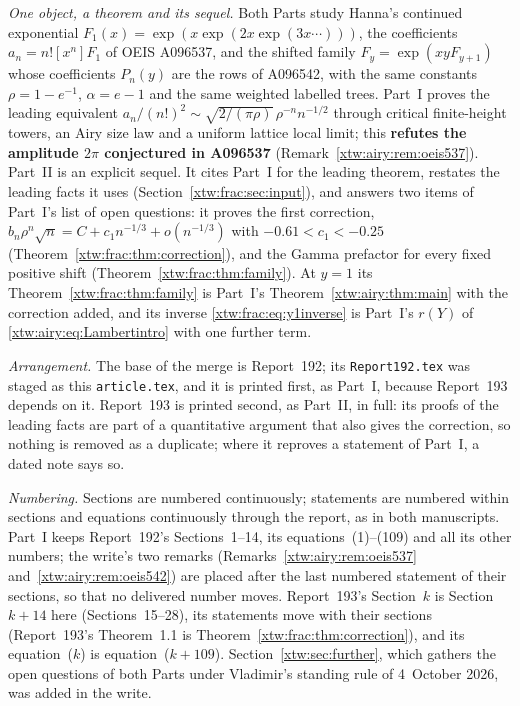 \documentclass[11pt]{article}
\theoremstyle{remark}\newtheorem{remark}[theorem]{Remark}
\newcommand{\file}[1]{\nolinkurl{#1}}
\begin{document}
\emph{One object, a theorem and its sequel.} Both Parts study Hanna's
continued exponential $F_1(x)=\exp(x\exp(2x\exp(3x\cdots)))$, the
coefficients $a_n=n![x^n]F_1$ of OEIS A096537, and the shifted family
$F_y=\exp(xyF_{y+1})$ whose coefficients $P_n(y)$ are the rows of A096542,
with the same constants $\rho=1-e^{-1}$, $\alpha=e-1$ and the same weighted
labelled trees. Part~I proves the leading equivalent
$a_n/(n!)^2\sim\sqrt{2/(\pi\rho)}\,\rho^{-n}n^{-1/2}$ through critical
finite-height towers, an Airy size law and a uniform lattice local limit; this
\textbf{refutes the amplitude $2\pi$ conjectured in A096537}
(Remark~\ref{xtw:airy:rem:oeis537}). Part~II is an explicit sequel. It cites
Part~I for the leading theorem, restates the leading facts it uses
(Section~\ref{xtw:frac:sec:input}), and answers two items of Part~I's list of
open questions: it proves the first correction,
$b_n\rho^n\sqrt n=C+c_1n^{-1/3}+o(n^{-1/3})$ with $-0.61<c_1<-0.25$
(Theorem~\ref{xtw:frac:thm:correction}), and the Gamma prefactor for every
fixed positive shift (Theorem~\ref{xtw:frac:thm:family}). At $y=1$ its
Theorem~\ref{xtw:frac:thm:family} is Part~I's Theorem~\ref{xtw:airy:thm:main}
with the correction added, and its inverse \eqref{xtw:frac:eq:y1inverse} is
Part~I's $r(Y)$ of \eqref{xtw:airy:eq:Lambertintro} with one further term.

\emph{Arrangement.} The base of the merge is Report~192; its
\file{Report192.tex} was staged as this \file{article.tex}, and it is printed
first, as Part~I, because Report~193 depends on it. Report~193 is printed
second, as Part~II, in full: its proofs of the leading facts are part of a
quantitative argument that also gives the correction, so nothing is removed
as a duplicate; where it reproves a statement of Part~I, a dated note says so.

\emph{Numbering.} Sections are numbered continuously; statements are numbered
within sections and equations continuously through the report, as in both
manuscripts. Part~I keeps Report~192's Sections~1--14, its
equations~(1)--(109) and all its other numbers; the write's two remarks
(Remarks~\ref{xtw:airy:rem:oeis537} and~\ref{xtw:airy:rem:oeis542}) are placed
after the last numbered statement of their sections, so that no delivered
number moves. Report~193's Section~$k$ is Section~$k+14$ here
(Sections~15--28), its statements move with their sections (Report~193's
Theorem~1.1 is Theorem~\ref{xtw:frac:thm:correction}), and its
equation~($k$) is equation~($k+109$). Section~\ref{xtw:sec:further}, which
gathers the open questions of both Parts under Vladimir's standing rule of
4~October 2026, was added in the write.
\end{document}
